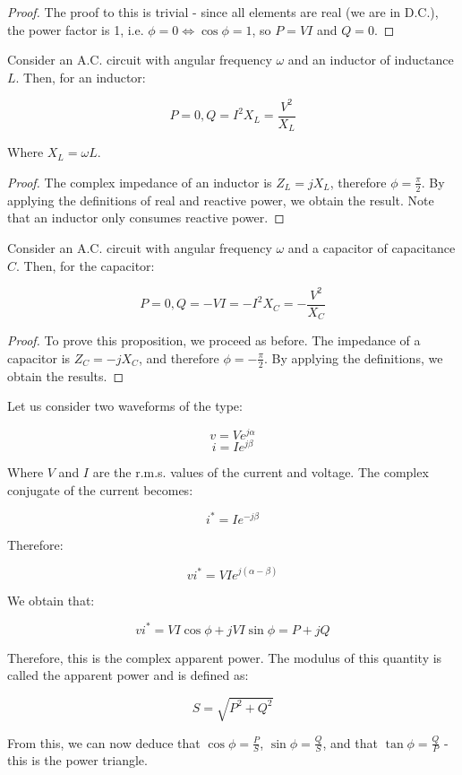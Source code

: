 \documentclass{article}
\begin{document}
\begin{proof}
    The proof to this is trivial - since all elements are real (we are in D.C.), the power factor is 1, i.e. $\phi = 0 \iff \cos{\phi} = 1$, so $P = VI$ and $Q = 0$.
\end{proof}

\begin{proposition}
    Consider an A.C. circuit with angular frequency $\omega$ and an inductor of inductance $L$. Then, for an inductor:

    \[ P = 0, Q = I^2X_L = \frac{V^2}{X_L} \]

    Where $X_L = \omega L$.
\end{proposition}

\begin{proof}
    The complex impedance of an inductor is $Z_L = jX_L$, therefore $\phi = \frac{\pi}{2}$. By applying the definitions of real and reactive power, we obtain the result. Note that an inductor only consumes reactive power.
\end{proof}

\begin{proposition}
    Consider an A.C. circuit with angular frequency $\omega$ and a capacitor of capacitance $C$. Then, for the capacitor:

    \[ P = 0, Q = -VI = -I^2X_C = -\frac{V^2}{X_C} \]
\end{proposition}

\begin{proof}
    To prove this proposition, we proceed as before. The impedance of a capacitor is $Z_C = -jX_C$, and therefore $\phi = -\frac{\pi}{2}$. By applying the definitions, we obtain the results.
\end{proof}

\begin{definition}
    Let us consider two waveforms of the type:

    \[ v = Ve^{j\alpha} \]
    \[ i = Ie^{j\beta} \]

    Where $V$ and $I$ are the r.m.s. values of the current and voltage. The complex conjugate of the current becomes:

    \[ i^* = Ie^{-j\beta} \]

    Therefore:

    \[ vi^* = VIe^{j(\alpha - \beta)} \]

    We obtain that:

    \[ vi^* = VI\cos{\phi} + jVI\sin{\phi} = P + jQ \]

    Therefore, this is the complex apparent power. The modulus of this quantity is called the apparent power and is defined as:

    \[ S = \sqrt{P^2 + Q^2} \]

    From this, we can now deduce that $\cos{\phi} = \frac{P}{S}$, $\sin{\phi} = \frac{Q}{S}$, and that $\tan{\phi} = \frac{Q}{P}$ - this is the power triangle.
\end{definition}
\end{document}
